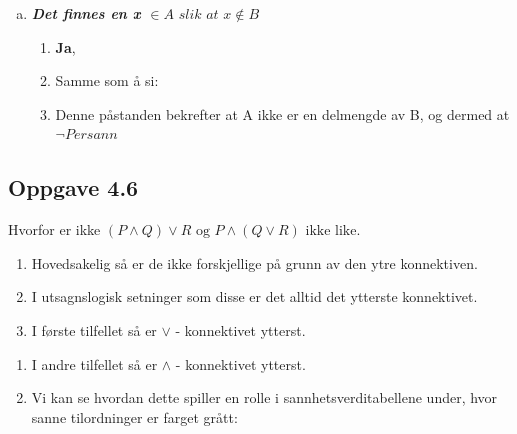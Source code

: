 \documentclass{article}
\begin{document}
\begin{enumerate}[(a)]
\begin{enumerate}[-]
        \item Denne påstanden beskriver et tilfelle hvor det finnes et element som er i begge, men sier ingenting om hele mengden A.
    \end{enumerate}
    \item \textbf{\textit{Det finnes en x $\in A \textit{ slik at } x \notin B$}}
    \begin{enumerate}[-]
        \item \textbf{Ja},
        \item Samme som å si: 
        \item Denne påstanden bekrefter at A ikke er en delmengde av B, og dermed at \textbf{\(\neg P er sann\)}
    \end{enumerate}
\end{enumerate}

\subsection*{Oppgave 4.6}
Hvorfor er ikke \( (P \wedge Q) \vee R \text{ og } P \wedge (Q \vee R) \text{ ikke like. }\)

\begin{enumerate}[-]
    \item Hovedsakelig så er de ikke forskjellige på grunn av den ytre konnektiven. 
    \item I utsagnslogisk setninger som disse er det alltid det ytterste konnektivet. 
    \item I første tilfellet så er $\vee$ -  konnektivet ytterst. 
\end{enumerate}

\begin{enumerate}[-]
    \item I andre tilfellet så er $\wedge$ -  konnektivet ytterst.
    \item Vi kan se hvordan dette spiller en rolle i sannhetsverditabellene under, hvor sanne tilordninger er farget grått:

\end{enumerate}
\end{document}
